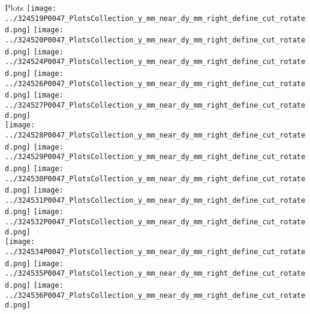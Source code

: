 \documentclass{beamer}
\begin{document}
\begin{frame}
\begin{block}{Plots}
                \texttt{[image: ../324519P0047\_PlotsCollection\_y\_mm\_near\_dy\_mm\_right\_define\_cut\_rotated.png]}
                \texttt{[image: ../324520P0047\_PlotsCollection\_y\_mm\_near\_dy\_mm\_right\_define\_cut\_rotated.png]}
                \texttt{[image: ../324524P0047\_PlotsCollection\_y\_mm\_near\_dy\_mm\_right\_define\_cut\_rotated.png]}
                \texttt{[image: ../324526P0047\_PlotsCollection\_y\_mm\_near\_dy\_mm\_right\_define\_cut\_rotated.png]}
                \texttt{[image: ../324527P0047\_PlotsCollection\_y\_mm\_near\_dy\_mm\_right\_define\_cut\_rotated.png]}\\
                \texttt{[image: ../324528P0047\_PlotsCollection\_y\_mm\_near\_dy\_mm\_right\_define\_cut\_rotated.png]}
                \texttt{[image: ../324529P0047\_PlotsCollection\_y\_mm\_near\_dy\_mm\_right\_define\_cut\_rotated.png]}
                \texttt{[image: ../324530P0047\_PlotsCollection\_y\_mm\_near\_dy\_mm\_right\_define\_cut\_rotated.png]}
                \texttt{[image: ../324531P0047\_PlotsCollection\_y\_mm\_near\_dy\_mm\_right\_define\_cut\_rotated.png]}
                \texttt{[image: ../324532P0047\_PlotsCollection\_y\_mm\_near\_dy\_mm\_right\_define\_cut\_rotated.png]}\\
                \texttt{[image: ../324534P0047\_PlotsCollection\_y\_mm\_near\_dy\_mm\_right\_define\_cut\_rotated.png]}
                \texttt{[image: ../324535P0047\_PlotsCollection\_y\_mm\_near\_dy\_mm\_right\_define\_cut\_rotated.png]}
                \texttt{[image: ../324536P0047\_PlotsCollection\_y\_mm\_near\_dy\_mm\_right\_define\_cut\_rotated.png]}

        \end{block}
\end{frame}
\end{document}
